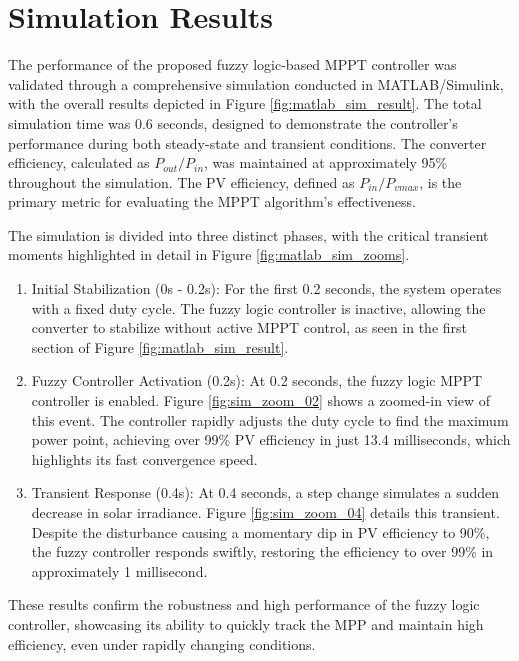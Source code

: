 \documentclass[a4paper,oneside,12pt]{report}
\numberwithin{equation}{chapter}
\begin{document}
\section{Simulation Results}\label{sec:matlab_sim_results}
The performance of the proposed fuzzy logic-based MPPT controller was validated through a comprehensive simulation conducted in MATLAB/Simulink, with the overall results depicted in Figure \ref{fig:matlab_sim_result}. The total simulation time was 0.6 seconds, designed to demonstrate the controller's performance during both steady-state and transient conditions. The converter efficiency, calculated as $P_{out}/P_{in}$, was maintained at approximately 95\% throughout the simulation. The PV efficiency, defined as $P_{in}/P_{vmax}$, is the primary metric for evaluating the MPPT algorithm's effectiveness.

The simulation is divided into three distinct phases, with the critical transient moments highlighted in detail in Figure \ref{fig:matlab_sim_zooms}.

\begin{enumerate}
    \item Initial Stabilization (0s - 0.2s): For the first 0.2 seconds, the system operates with a fixed duty cycle. The fuzzy logic controller is inactive, allowing the converter to stabilize without active MPPT control, as seen in the first section of Figure \ref{fig:matlab_sim_result}.

    \item Fuzzy Controller Activation (0.2s): At 0.2 seconds, the fuzzy logic MPPT controller is enabled. Figure \ref{fig:sim_zoom_02} shows a zoomed-in view of this event. The controller rapidly adjusts the duty cycle to find the maximum power point, achieving over 99\% PV efficiency in just 13.4 milliseconds, which highlights its fast convergence speed.

    \item Transient Response (0.4s): At 0.4 seconds, a step change simulates a sudden decrease in solar irradiance. Figure \ref{fig:sim_zoom_04} details this transient. Despite the disturbance causing a momentary dip in PV efficiency to 90\%, the fuzzy controller responds swiftly, restoring the efficiency to over 99\% in approximately 1 millisecond.
\end{enumerate}

These results confirm the robustness and high performance of the fuzzy logic controller, showcasing its ability to quickly track the MPP and maintain high efficiency, even under rapidly changing conditions.
\end{document}
